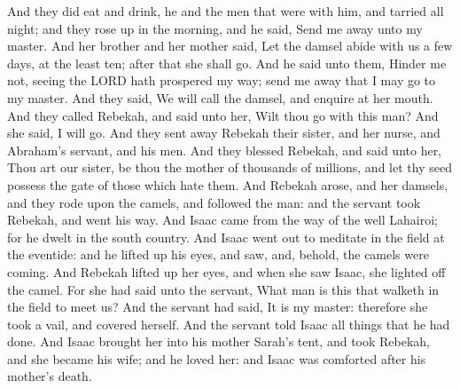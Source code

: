 \begin{biblechapter}
\verse And they did eat and drink, he and the men that were with him, and tarried all night; and they rose up in the morning, and he said, Send me away unto my master.
\verse And her brother and her mother said, Let the damsel abide with us a few days, at the least ten; after that she shall go.
\verse And he said unto them, Hinder me not, seeing the LORD hath prospered my way; send me away that I may go to my master.
\verse And they said, We will call the damsel, and enquire at her mouth.
\verse And they called Rebekah, and said unto her, Wilt thou go with this man? And she said, I will go.
\verse And they sent away Rebekah their sister, and her nurse, and Abraham's servant, and his men.
\verse And they blessed Rebekah, and said unto her, Thou art our sister, be thou the mother of thousands of millions, and let thy seed possess the gate of those which hate them.
\verse And Rebekah arose, and her damsels, and they rode upon the camels, and followed the man: and the servant took Rebekah, and went his way.
\verse And Isaac came from the way of the well Lahairoi; for he dwelt in the south country.
\verse And Isaac went out to meditate in the field at the eventide: and he lifted up his eyes, and saw, and, behold, the camels were coming.
\verse And Rebekah lifted up her eyes, and when she saw Isaac, she lighted off the camel.
\verse For she had said unto the servant, What man is this that walketh in the field to meet us? And the servant had said, It is my master: therefore she took a vail, and covered herself.
\verse And the servant told Isaac all things that he had done.
\verse And Isaac brought her into his mother Sarah's tent, and took Rebekah, and she became his wife; and he loved her: and Isaac was comforted after his mother's death.
\end{biblechapter}


